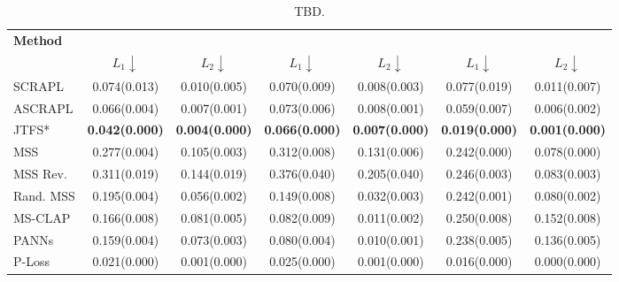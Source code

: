 \begin{table}[t]
\centering
\caption{TBD.}
\label{tab:gran_test_results}
\setlength{\tabcolsep}{3.3pt}
\begin{tabular}{
    l
    S[table-format=1.3(1.3)]
    S[table-format=1.3(1.3)]
    S[table-format=1.3(1.3)]
    S[table-format=1.3(1.3)]
    S[table-format=1.3(1.3)]
    S[table-format=1.3(1.3)]
}
    \toprule
    \bf{Method} &  &  & \\
    \cmidrule(lr){2-3} \cmidrule(lr){4-5} \cmidrule(lr){6-7}
           & {$L_1 \downarrow$} & {$L_2 \downarrow$} & {$L_1 \downarrow$} & {$L_2 \downarrow$} & {$L_1 \downarrow$} & {$L_2 \downarrow$} \\
    \midrule
    SCRAPL        &     0.074(0.013) &     0.010(0.005) &     0.070(0.009) &     0.008(0.003) &     0.077(0.019) &     0.011(0.007) \\
    ASCRAPL       &     0.066(0.004) &     0.007(0.001) &     0.073(0.006) &     0.008(0.001) &     0.059(0.007) &     0.006(0.002) \\
    JTFS*         & \bf 0.042(0.000) & \bf 0.004(0.000) & \bf 0.066(0.000) & \bf 0.007(0.000) & \bf 0.019(0.000) & \bf 0.001(0.000) \\
    MSS           &     0.277(0.004) &     0.105(0.003) &     0.312(0.008) &     0.131(0.006) &     0.242(0.000) &     0.078(0.000) \\
    MSS Rev.      &     0.311(0.019) &     0.144(0.019) &     0.376(0.040) &     0.205(0.040) &     0.246(0.003) &     0.083(0.003) \\
    Rand. MSS     &     0.195(0.004) &     0.056(0.002) &     0.149(0.008) &     0.032(0.003) &     0.242(0.001) &     0.080(0.002) \\
    MS-CLAP       &     0.166(0.008) &     0.081(0.005) &     0.082(0.009) &     0.011(0.002) &     0.250(0.008) &     0.152(0.008) \\
    PANNs         &     0.159(0.004) &     0.073(0.003) &     0.080(0.004) &     0.010(0.001) &     0.238(0.005) &     0.136(0.005) \\
    \midrule
    P-Loss        &     0.021(0.000) &     0.001(0.000) &     0.025(0.000) &     0.001(0.000) &     0.016(0.000) &     0.000(0.000) \\
    \bottomrule
\end{tabular}
\end{table}












